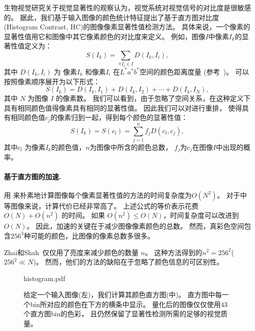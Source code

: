 \documentclass[final]{cvpr}
\newcommand{\Lab}{$L^*a^*b^*$}
\newcommand{\mypara}[1]{\paragraph{#1.}}
\begin{document}
生物视觉研究关于视觉显著性的观察认为，视觉系统对视觉信号的对比度是很敏感的。
据此，我们基于输入图像的颜色统计特征提出了基于直方图对比度
(Histogram Contrast, HC)的图像像素显著性值检测方法。
具体来说，一个像素的显著性值用它和图像中其它像素颜色的对比度来定义。
例如，图像$I$中像素$I_k$的显著性值定义为：
\begin{equation}\label{equ:PixelColorContrast}
    S(I_k) = \sum_{\forall I_i \in I} D(I_k, I_i),
\end{equation}
其中 $D(I_k, I_i)$ 为 像素$I_k$ 和像素$I_i$ 在\Lab 空间的颜色距离度量
(参考~\cite{06acmmm/ZhaiS_spatiotemporal})。
 可以按照像素顺序展开为以下形式：
\begin{equation}\label{equ:PixelCCPixelOrder}
    S(I_k) = D(I_k, I_1) + D(I_k, I_2) + \cdots + D(I_k, I_N),
\end{equation}
其中 $N$ 为图像 $I$ 的像素数。
我们可以看到，由于忽略了空间关系，在这种定义下具有相同颜色值得像素具有相同的显著性值。
因此我们可以对进行重排，
使得具有相同颜色值$c_j$的像素归到一起，得到每个颜色的显著性值：
\begin{equation}\label{equ:PixelCCColorOrder}
    S(I_k) = S(c_l) = \sum_{j=1}^{n}{f_j D(c_l, c_j)},
\end{equation}
其中$c_l$ 为像素$I_k$的颜色值，$n$为图像中所含的颜色总数，
$f_j$为$c_j$在图像$I$中出现的概率。


\mypara{基于直方图的加速}用
来朴素地计算图像每个像素显著性值的方法的时间复杂度为$O(N^2)$。
对于中等图像来说，计算代价已经非常高了。
上述公式的等价表示花费$O(N) + O(n^2)$ 的时间。
如果 $O(n^2) \leq O(N)$，时间复杂度可以改进到$O(N)$。
因此，加速的关键在于减少图像像素颜色的总数。
然而，真彩色空间包含$256^3$种可能的颜色，比图像的像素总数多很多。

Zhai和Shah~\cite{06acmmm/ZhaiS_spatiotemporal}仅仅用了亮度来减少颜色的数量 $n$。
这种方法得到的$n^2=256^2$($256^2 \ll N$)。
然而，他们的方法的缺陷在于忽略了颜色信息的可区别性。


\begin{figure}
  	\begin{overpic}[width=\columnwidth]{histogram.pdf}
    \end{overpic}
    \caption{给定一个输入图像(左)，我们计算其颜色直方图(中)。
        直方图中每一个bin所对应的颜色在下方的横条中显示。
        量化后的图像仅仅使用$43$个直方图bin的色彩，
        且仍然保留了显著性检测所需的足够的视觉质量。
    }\label{fig:colorFre}
\end{figure}
\end{document}
